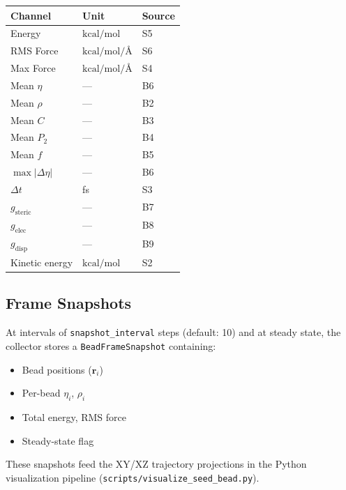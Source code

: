 \documentclass[11pt, a4paper, oneside]{article}
\newcommand{\file}[1]{\texttt{#1}}
\newcommand{\type}[1]{\texttt{#1}}
\newcommand{\field}[1]{\texttt{#1}}
\newcommand{\Ang}{\text{\AA}}
\newcommand{\kcalmol}{\text{kcal/mol}}
\begin{document}
\begin{center}
\begin{tabular}{lll}
  \toprule
  \textbf{Channel} & \textbf{Unit} & \textbf{Source} \\
  \midrule
  Energy          & $\kcalmol$     & S5 \\
  RMS Force       & $\kcalmol/\Ang$ & S6 \\
  Max Force       & $\kcalmol/\Ang$ & S4 \\
  Mean $\eta$     & ---            & B6 \\
  Mean $\rho$     & ---            & B2 \\
  Mean $C$        & ---            & B3 \\
  Mean $P_2$      & ---            & B4 \\
  Mean $f$        & ---            & B5 \\
  $\max|\Delta\eta|$ & ---         & B6 \\
  $\Delta t$      & fs             & S3 \\
  $g_{\text{steric}}$  & ---       & B7 \\
  $g_{\text{elec}}$    & ---       & B8 \\
  $g_{\text{disp}}$    & ---       & B9 \\
  Kinetic energy  & $\kcalmol$     & S2 \\
  \bottomrule
\end{tabular}
\end{center}

\subsection{Frame Snapshots}
\label{sec:frame-snapshots}

At intervals of \field{snapshot\_interval} steps (default: 10) and at
steady state, the collector stores a \type{BeadFrameSnapshot} containing:
\begin{itemize}
  \item Bead positions ($\mathbf{r}_i$)
  \item Per-bead $\eta_i$, $\rho_i$
  \item Total energy, RMS force
  \item Steady-state flag
\end{itemize}

These snapshots feed the XY/XZ trajectory projections in the Python
visualization pipeline (\file{scripts/visualize\_seed\_bead.py}).
\end{document}
